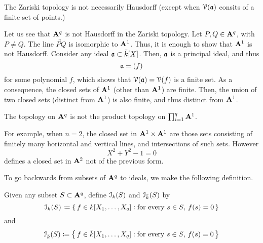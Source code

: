The Zariski topology is not necessarily Hausdorff (except when $\mathcal{V}(\mathfrak{a})$
consits of a finite set of points.)

Let us see that $\mathbf{A}^q$ is not Hausdorff in the Zariski topology. Let
$P,Q\in\mathbf{A}^q$, with $P\neq Q$. The line $\overleftrightarrow{PQ}$ is
isomorphic to $\mathbf{A}^1$. Thus, it is enough to show that $\mathbf{A}^1$ is not
Hausdorff. Consider any ideal $\mathfrak{a}\subset\bar k[X]$. Then, $\mathfrak{a}$ is a
principal ideal, and thus
\[
\mathfrak{a}=(f)
\]
for some polynomial $f$, which shows that $\mathcal{V}(\mathfrak{a})=\mathcal{V}(f)$ is a finite
set. As a consequence, the closed sets of $\mathbf{A}^1$ (other than $\mathbf{A}^1$)
are finite. Then, the union of two closed sets (distinct from $\mathbf{A}^1$) is
also finite, and thus distinct from $\mathbf{A}^1$.

The topology on $\mathbf{A}^q$ is not the product topology on
$\prod_{i=1}^q\mathbf{A}^1$.

For example, when $n=2$, the closed set in $\mathbf{A}^1\times\mathbf{A}^1$ are those
sets consisting of finitely many horizontal and vertical lines, and
intersections of such sets. However
\[
X^2+Y^2-1=0
\]
defines a closed set in $\mathbf{A}^2$ not of the previous form.

To go backwards from subsets of $\mathbf{A}^q$ to ideals, we make the following
definition.
\begin{definition}
 Given any subset $S\subset\mathbf{A}^q$, define $\mathcal{I}_k(S)$ and $\mathcal{I}_{\bar
   k}(S)$ by
\[
\mathcal{I}_k(S)\coloneqq\left\{\,f\in k[X_1,\dotsc,X_q]:
\text{for every $s\in S$, $f(s)=0$}\,\right\}
\]
and
\[
\mathcal{I}_{\bar k}(S)\coloneqq\left\{\,f\in\bar k[X_1,\dotsc,X_q]:
\text{for every $s\in S$, $f(s)=0$}\,\right\}
\]
\end{definition}

